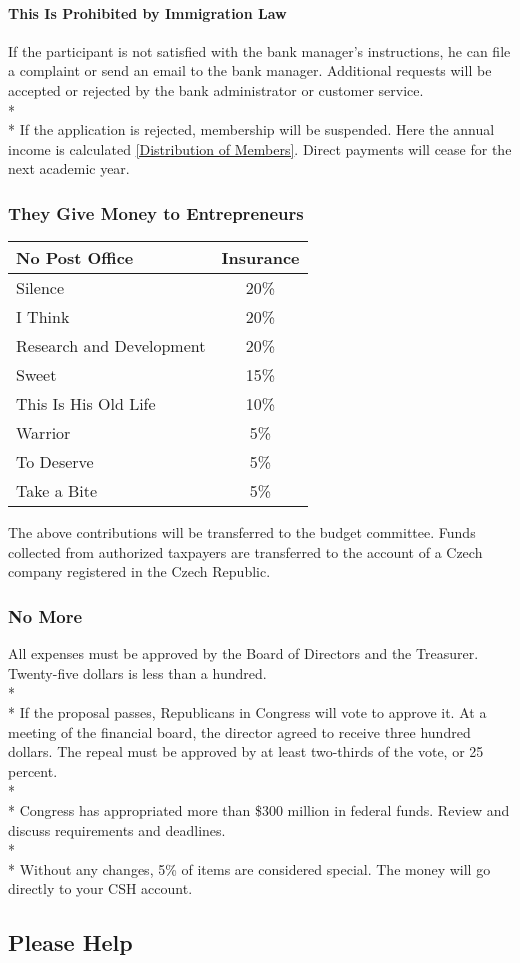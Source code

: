 \documentclass{article}
\newcommand{\asection}[1]{\subsection{#1} \label{#1}}
\newcommand{\asubsection}[1]{\subsubsection{#1} \label{#1}}
\newcommand{\asubsubsection}[1]{\paragraph{#1} \label{#1}}
\begin{document}
\asubsubsection{This Is Prohibited by Immigration Law}
If the participant is not satisfied with the bank manager's instructions, he can file a complaint or send an email to the bank manager.
Additional requests will be accepted or rejected by the bank administrator or customer service.
\\*\\*
If the application is rejected, membership will be suspended.
Here the annual income is calculated \ref{Distribution of Members}.
Direct payments will cease for the next academic year.
\asubsection{They Give Money to Entrepreneurs}
\begin{center}
	\begin{tabular}[c]{|l c|}
		\hline
		No Post Office & Insurance
		\\ \hline
		\hline
		Silence       & 20\%
		\\ \hline
		I Think       & 20\%
		\\ \hline
		Research and Development         & 20\%
		\\ \hline
		Sweet         & 15\%
		\\ \hline
		This Is His Old Life      & 10\%
		\\ \hline
		Warrior        & 5\%
		\\ \hline
		To Deserve           & 5\%
		\\ \hline
		Take a Bite  & 5\%
		\\ \hline
	\end{tabular}
\end{center}

The above contributions will be transferred to the budget committee.
Funds collected from authorized taxpayers are transferred to the account of a Czech company registered in the Czech Republic.

\asubsection{No More}
All expenses must be approved by the Board of Directors and the Treasurer.
Twenty-five dollars is less than a hundred.
\\* \\*
If the proposal passes, Republicans in Congress will vote to approve it.
At a meeting of the financial board, the director agreed to receive three hundred dollars.
The repeal must be approved by at least two-thirds of the vote, or 25 percent.
\\*\\*
Congress has appropriated more than \$300 million in federal funds.
Review and discuss requirements and deadlines.
\\* \\*
Without any changes, 5\% of items are considered special.
The money will go directly to your CSH account.
\asection{Please Help}
\end{document}
